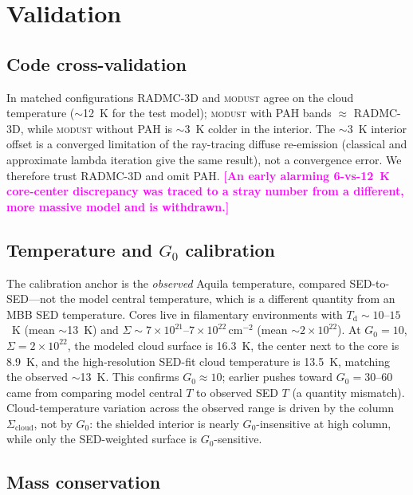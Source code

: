 \documentclass[11pt,a4paper]{article}
\newcommand{\note}[1]{\textcolor{magenta}{\textbf{[#1]}}}
\newcommand{\Scloud}{\Sigma_{\mathrm{cloud}}}
\begin{document}
\section{Validation}

\subsection{Code cross-validation}
\label{sec:crossval}

In matched configurations RADMC-3D and \textsc{modust} agree on the cloud
temperature ($\sim$12~K for the test model); \textsc{modust} with PAH bands
$\approx$ RADMC-3D, while \textsc{modust} without PAH is $\sim$3~K colder in
the interior. The $\sim$3~K interior offset is a converged limitation of the
ray-tracing diffuse re-emission (classical and approximate lambda iteration
give the same result), not a convergence error. We therefore trust
RADMC-3D and omit PAH. \note{An early alarming 6-vs-12~K core-center
discrepancy was traced to a stray number from a different, more massive
model and is withdrawn.}

\subsection{Temperature and $G_{0}$ calibration}
\label{sec:tcalib}

The calibration anchor is the \emph{observed} Aquila temperature, compared
SED-to-SED---not the model central temperature, which is a different
quantity from an MBB SED temperature. Cores live in filamentary
environments with $T_{\mathrm d}\sim 10$--$15$~K (mean $\sim$13~K) and
$\Sigma\sim 7\times10^{21}$--$7\times10^{22}\,\mathrm{cm^{-2}}$
(mean $\sim 2\times10^{22}$). At $G_{0}=10$, $\Sigma=2\times10^{22}$, the
modeled cloud surface is 16.3~K, the center next to the core is 8.9~K, and
the high-resolution SED-fit cloud temperature is 13.5~K, matching the
observed $\sim$13~K. This confirms $G_{0}\approx 10$; earlier pushes toward
$G_{0}=30$--$60$ came from comparing model central $T$ to observed SED $T$
(a quantity mismatch). Cloud-temperature variation across the observed range
is driven by the column $\Scloud$, not by $G_{0}$: the shielded interior is
nearly $G_{0}$-insensitive at high column, while only the SED-weighted
surface is $G_{0}$-sensitive.

\subsection{Mass conservation}
\end{document}
